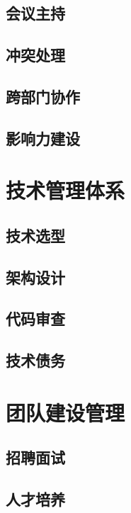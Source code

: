 \documentclass[openany,10pt,UTF8]{ctexbook}
\begin{document}
\chapter{会议主持}

\chapter{冲突处理}

\chapter{跨部门协作}

\chapter{影响力建设}


\part{技术管理体系}
\chapter{技术选型}

\chapter{架构设计}

\chapter{代码审查}

\chapter{技术债务}


\part{团队建设管理}
\chapter{招聘面试}

\chapter{人才培养}

\end{document}
